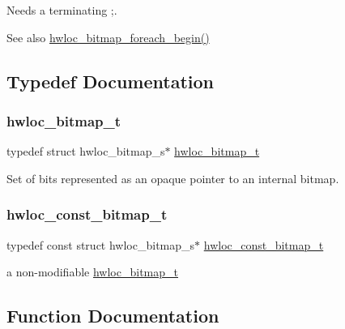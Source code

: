 Needs a terminating \textquotesingle{};\textquotesingle{}.

\begin{DoxySeeAlso}{See also}
\hyperlink{a00205_ga3f6861045a8029ade373510ffa727d2a}{hwloc\+\_\+bitmap\+\_\+foreach\+\_\+begin()} 
\end{DoxySeeAlso}


\subsection{Typedef Documentation}
\mbox{\label{a00205_gaa3c2bf4c776d603dcebbb61b0c923d84}} 
\subsubsection{\texorpdfstring{hwloc\+\_\+bitmap\+\_\+t}{hwloc\_bitmap\_t}}
{\footnotesize\ttfamily typedef struct hwloc\+\_\+bitmap\+\_\+s$\ast$ \hyperlink{a00205_gaa3c2bf4c776d603dcebbb61b0c923d84}{hwloc\+\_\+bitmap\+\_\+t}}



Set of bits represented as an opaque pointer to an internal bitmap. 

\mbox{\label{a00205_gae991a108af01d408be2776c5b2c467b2}} 
\subsubsection{\texorpdfstring{hwloc\+\_\+const\+\_\+bitmap\+\_\+t}{hwloc\_const\_bitmap\_t}}
{\footnotesize\ttfamily typedef const struct hwloc\+\_\+bitmap\+\_\+s$\ast$ \hyperlink{a00205_gae991a108af01d408be2776c5b2c467b2}{hwloc\+\_\+const\+\_\+bitmap\+\_\+t}}



a non-\/modifiable \hyperlink{a00205_gaa3c2bf4c776d603dcebbb61b0c923d84}{hwloc\+\_\+bitmap\+\_\+t} 



\subsection{Function Documentation}
\mbox{\label{a00205_ga06d505f8a1c0a536614f65f503ee6d93}} 
